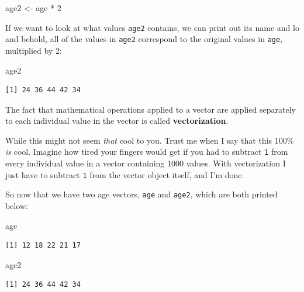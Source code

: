 \documentclass[
  letterpaper,
  DIV=11,
  numbers=noendperiod]{scrreprt}
\newenvironment{Shaded}{\begin{snugshade}}{\end{snugshade}}
\newcommand{\DecValTok}[1]{\textcolor[rgb]{0.68,0.00,0.00}{#1}}
\newcommand{\NormalTok}[1]{\textcolor[rgb]{0.00,0.23,0.31}{#1}}
\newcommand{\OtherTok}[1]{\textcolor[rgb]{0.00,0.23,0.31}{#1}}
\newcommand{\SpecialCharTok}[1]{\textcolor[rgb]{0.37,0.37,0.37}{#1}}
\begin{document}
\begin{Shaded}
\begin{Highlighting}[]
\NormalTok{age2 }\OtherTok{\textless{}{-}}\NormalTok{ age }\SpecialCharTok{*} \DecValTok{2}
\end{Highlighting}
\end{Shaded}

If we want to look at what values \texttt{age2} contains, we can print
out its name and lo and behold, all of the values in \texttt{age2}
correspond to the original values in \texttt{age}, multiplied by 2:

\begin{Shaded}
\begin{Highlighting}[]
\NormalTok{age2}
\end{Highlighting}
\end{Shaded}

\begin{verbatim}
[1] 24 36 44 42 34
\end{verbatim}

The fact that mathematical operations applied to a vector are applied
separately to each individual value in the vector is called
\textbf{vectorization}.

While this might not seem \emph{that} cool to you. Trust me when I say
that this 100\% \emph{is} cool. Imagine how tired your fingers would get
if you had to subtract \texttt{1} from every individual value in a
vector containing 1000 values. With vectorization I just have to
subtract \texttt{1} from the vector object itself, and I'm done.

So now that we have two age vectors, \texttt{age} and \texttt{age2},
which are both printed below:

\begin{Shaded}
\begin{Highlighting}[]
\NormalTok{age}
\end{Highlighting}
\end{Shaded}

\begin{verbatim}
[1] 12 18 22 21 17
\end{verbatim}

\begin{Shaded}
\begin{Highlighting}[]
\NormalTok{age2}
\end{Highlighting}
\end{Shaded}

\begin{verbatim}
[1] 24 36 44 42 34
\end{verbatim}
\end{document}
